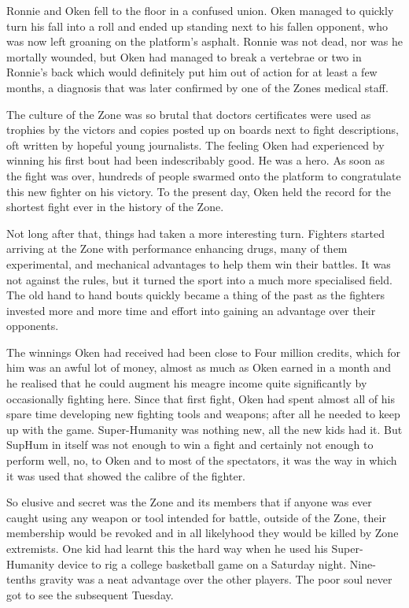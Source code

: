 Ronnie and Oken fell to the floor in a confused union. Oken managed to quickly turn his fall into a roll and ended up standing next to his fallen opponent, who was now left groaning on the platform's asphalt. Ronnie was not dead, nor was he mortally wounded, but Oken had managed to break a vertebrae or two in Ronnie's back which would definitely put him out of action for at least a few months, a diagnosis that was later confirmed by one of the Zones medical staff.

The culture of the Zone was so brutal that doctors certificates were used as trophies by the victors and copies posted up on boards next to fight descriptions, oft written by hopeful young journalists. The feeling Oken had experienced by winning his first bout had been indescribably good. He was a hero. As soon as the fight was over, hundreds of people swarmed onto the platform to congratulate this new fighter on his victory. To the present day, Oken held the record for the shortest fight ever in the history of the Zone.

Not long after that, things had taken a more interesting turn. Fighters started arriving at the Zone with performance enhancing drugs, many of them experimental, and mechanical advantages to help them win their battles. It was not against the rules, but it turned the sport into a much more specialised field. The old hand to hand bouts quickly became a thing of the past as the fighters invested more and more time and effort into gaining an advantage over their opponents.

The winnings Oken had received had been close to Four million credits, which for him was an awful lot of money, almost as much as Oken earned in a month and he realised that he could augment his meagre income quite significantly by occasionally fighting here. Since that first fight, Oken had spent almost all of his spare time developing new fighting tools and weapons; after all he needed to keep up with the game. Super-Humanity was nothing new, all the new kids had it. But SupHum in itself was not enough to win a fight and certainly not enough to perform well, no, to Oken and to most of the spectators, it was the way in which it was used that showed the calibre of the fighter.

So elusive and secret was the Zone and its members that if anyone was ever caught using any weapon or tool intended for battle, outside of the Zone, their membership would be revoked and in all likelyhood they would be killed by Zone extremists. One kid had learnt this the hard way when he used his Super-Humanity device to rig a college basketball game on a Saturday night. Nine-tenths gravity was a neat advantage over the other players. The poor soul never got to see the subsequent Tuesday.

